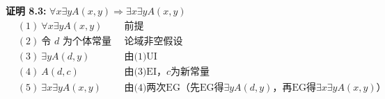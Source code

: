 \noindent
\textbf{证明 8.3:} $\forall x\exists yA(x,y)\Rightarrow \exists x\exists yA(x,y)$
\vspace{-10pt}
\begin{align*}
&(1)\ \forall x\exists yA(x,y) && \text{前提} \\
&(2)\ \text{令 $d$ 为个体常量} && \text{论域非空假设} \\
&(3)\ \exists yA(d,y) && \text{由(1)UI} \\
&(4)\ A(d,c) && \text{由(3)EI，$c$为新常量} \\
&(5)\ \exists x\exists yA(x,y) && \text{由(4)两次EG（先EG得$\exists yA(d,y)$，再EG得$\exists x\exists yA(x,y)$）}
\end{align*}
